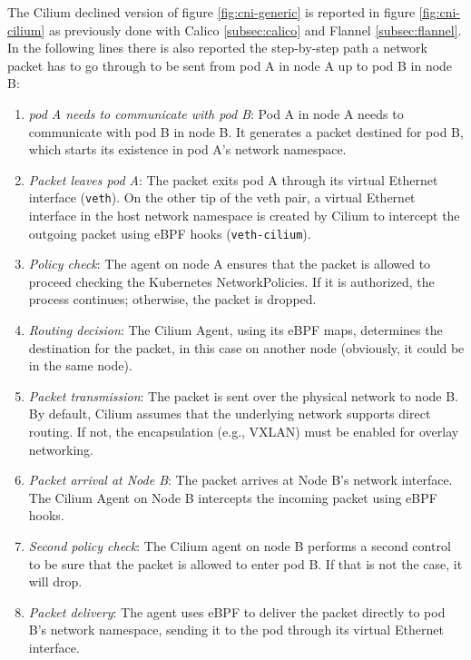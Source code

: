 The Cilium declined version of figure \ref{fig:cni-generic} is reported in
figure \ref{fig:cni-cilium} as previously done with Calico \ref{subsec:calico}
and Flannel \ref{subsec:flannel}.
In the following lines there is also reported the step-by-step path a network
packet has to go through to be sent from pod A in node A up to pod B in node B:

\begin{enumerate}
  \itemsep0em
  \item \textit{pod A needs to communicate with pod B}: Pod A in node A needs to
    communicate with pod B in node B. It generates a packet destined for pod B,
    which starts its existence in pod A's network namespace.
  \item \textit{Packet leaves pod A}: The packet exits pod A through its virtual
    Ethernet interface (\texttt{veth}). On the other tip of the veth pair, a
    virtual Ethernet interface in the host network namespace is created by
    Cilium to intercept the outgoing packet using eBPF hooks
    (\texttt{veth-cilium}).
  \item \textit{Policy check}: The agent on node A ensures that the packet is
    allowed to proceed checking the Kubernetes NetworkPolicies. If it is
    authorized,  the process continues; otherwise, the packet is dropped.
  \item \textit{Routing decision}: The Cilium Agent, using its eBPF maps,
    determines the destination for the packet, in this case on another node
    (obviously, it could be in the same node).
  \item \textit{Packet transmission}: The packet is sent over the physical
    network to node B. By default, Cilium assumes that the underlying network
    supports direct routing. If not, the encapsulation (e.g., VXLAN) must be
    enabled for overlay networking.
  \item \textit{Packet arrival at Node B}: The packet arrives at Node B's
    network interface. The Cilium Agent on Node B intercepts the incoming packet
    using eBPF hooks.
  \item \textit{Second policy check}: The Cilium agent on node B performs a
    second control to be sure that the packet is allowed to enter pod B.
    If that is not the case, it will drop.
  \item \textit{Packet delivery}: The agent uses eBPF to deliver the packet
    directly to pod B's network namespace, sending it to the pod through its
    virtual Ethernet interface.
\end{enumerate}

